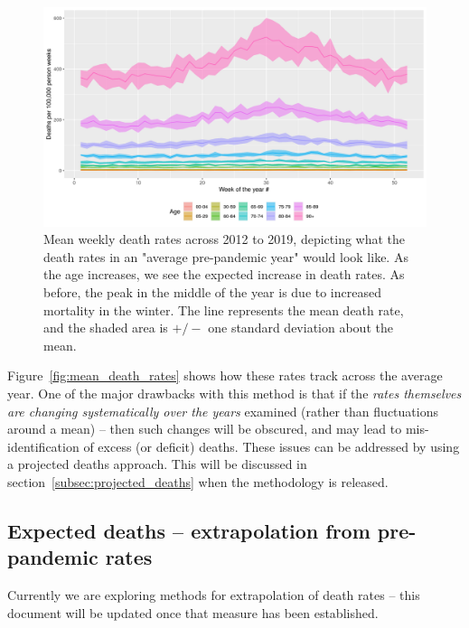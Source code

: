 \documentclass[
10pt, %
a4paper, %
oneside, %
DIV=16,
parskip=full,
headinclude,footinclude %
]{scrartcl}
\begin{document}
\begin{figure}[htb!]
\centering 
\includegraphics[width = 1.0 \columnwidth]{plots/mean_death_rates} 
\caption[Mean death rates pre-COVID]{Mean weekly death rates across 2012 to 2019, depicting what the death rates in an "average pre-pandemic year" would look like. As the age increases, we see the expected increase in death rates. As before, the peak in the middle of the year is due to increased mortality in the winter. The line represents the mean death rate, and the shaded area is $+/-$ one standard deviation about the mean.}
\label{fig:mean_death_rates} 
\end{figure}

Figure~\vref{fig:mean_death_rates} shows how these rates track across the average year. One of the major drawbacks with this method is that if the \emph{rates themselves are changing systematically over the years} examined (rather than fluctuations around a mean) -- then such changes will be obscured, and may lead to mis-identification of excess (or deficit) deaths. These issues can be addressed by using a projected deaths approach. This will be discussed in section~\vref{subsec:projected_deaths} when the methodology is released.


\subsection{Expected deaths -- extrapolation from pre-pandemic rates}
\label{subsec:projected_deaths}

Currently we are exploring methods for extrapolation of death rates -- this document will be updated once that measure has been established.
\end{document}
